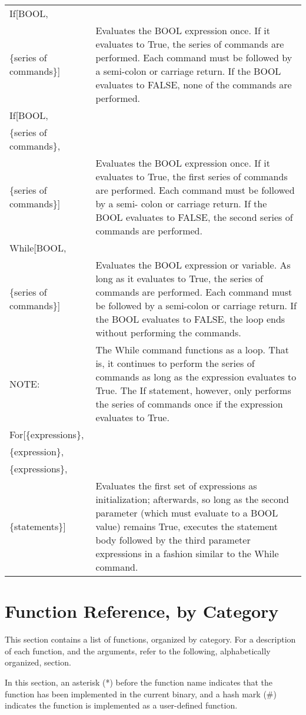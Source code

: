 \begin{tabular}{lp{4in}}
If[BOOL, & \\
\{series of commands\}] & Evaluates the BOOL expression
once. If it evaluates to True, the series of commands are performed.
Each command must be followed by a semi-colon or carriage return.  If
the BOOL evaluates to FALSE, none of the commands are performed.\\
If[BOOL, & \\
\{series of commands\}, & \\
\{series of commands\}] & Evaluates the BOOL expression
once. If it evaluates to True, the first series of commands are
performed.  Each command must be followed by a semi- colon or carriage
return.  If the BOOL evaluates to FALSE, the second series of
commands are performed. \\
While[BOOL, &\\
\{series of commands\}] & Evaluates the BOOL
expression or variable.  As long as it evaluates to True, the series
of commands are performed.  Each command must be followed by a
semi-colon or carriage return.  If the BOOL evaluates to FALSE, the
loop ends without performing the commands.\\
NOTE: & The While command functions as a
loop.  That is, it continues to perform the series of commands as long
as the expression evaluates to True.  The If statement, however, only
performs the series of commands once if the expression evaluates to
True.\\
For[\{expressions\}, & \\
\{expression\}, & \\
\{expressions\}, & \\
\{statements\}] & Evaluates the first set of expressions as initialization;
afterwards, so long as the second parameter (which must evaluate to a 
BOOL value) remains True, executes the statement body followed by the
third parameter expressions in a fashion similar to the While command.
\end{tabular}

\section{Function Reference, by Category}

This section contains a list of functions, organized by
category.  For a description of each function, and the arguments,
refer to the following, alphabetically organized, section.

\noindent In this section, an asterisk (*) before the function name indicates
that the function has been implemented in the current binary, and a
hash mark (\#) indicates the function is implemented as a user-defined
function.

